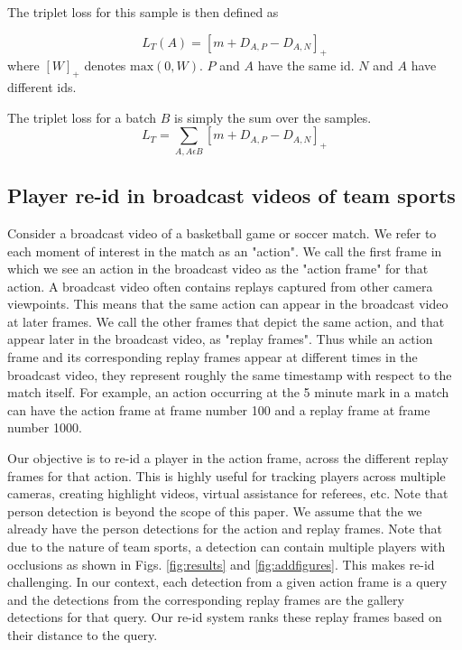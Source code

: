 \documentclass{article}
\begin{document}
The triplet loss for this sample is then defined as

\begin{equation}
    L_{T}(A) = [m + D_{A,P} - D_{A,N}]_{+}
\end{equation}
where $[W]_+$ denotes $\text{max}(0, W)$. $P$ and $A$ have the same id. $N$ and $A$ have different ids.

The triplet loss for a batch $B$ is simply the sum over the samples.
\begin{equation}
\label{eq:tripletloss}
    L_{T} = \sum_{A, A \epsilon B} [m + D_{A,P} - D_{A,N}]_{+}
\end{equation}





\subsection{Player re-id in broadcast videos of team sports}
\label{sec:sports-reid}
Consider a broadcast video of a basketball game or soccer match. We refer to each moment of interest in the match as an "action". We call the first frame in which we see an action in the broadcast video as the "action frame" for that action. A broadcast video often contains replays captured from other camera viewpoints. This means that the same action can appear in the broadcast video at later frames. We call the other frames that depict the same action, and that appear later in the broadcast video, as "replay frames". Thus while an action frame and its corresponding replay frames appear at different times in the broadcast video, they represent roughly the same timestamp with respect to the match itself. For example, an action occurring at the 5 minute mark in a match can have the action frame at frame number 100 and a replay frame at frame number 1000.

Our objective is to re-id a player in the action frame, across the different replay frames for that action. This is highly useful for tracking players across multiple cameras, creating highlight videos, virtual assistance for referees, etc. Note that person detection is beyond the scope of this paper. We assume that the we already have the person detections for the action and replay frames. Note that due to the nature of team sports, a detection can contain multiple players with occlusions as shown in Figs. \ref{fig:results} and \ref{fig:addfigures}. This makes re-id challenging. In our context, each detection from a given action frame is a query and the detections from the corresponding replay frames are the gallery detections for that query. Our re-id system ranks these replay frames based on their distance to the query.
\end{document}

